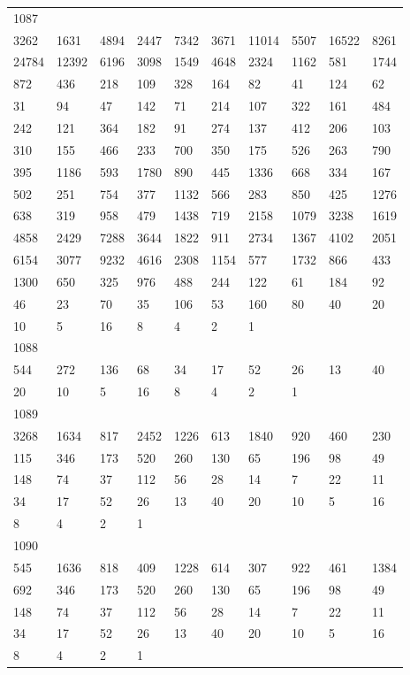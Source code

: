 \begin{longtable}{*{10}{l}}
1087&&&&&&&&&\\
3262& 1631& 4894& 2447& 7342& 3671& 11014& 5507& 16522& 8261\\
24784& 12392& 6196& 3098& 1549& 4648& 2324& 1162& 581& 1744\\
872& 436& 218& 109& 328& 164& 82& 41& 124& 62\\
31& 94& 47& 142& 71& 214& 107& 322& 161& 484\\
242& 121& 364& 182& 91& 274& 137& 412& 206& 103\\
310& 155& 466& 233& 700& 350& 175& 526& 263& 790\\
395& 1186& 593& 1780& 890& 445& 1336& 668& 334& 167\\
502& 251& 754& 377& 1132& 566& 283& 850& 425& 1276\\
638& 319& 958& 479& 1438& 719& 2158& 1079& 3238& 1619\\
4858& 2429& 7288& 3644& 1822& 911& 2734& 1367& 4102& 2051\\
6154& 3077& 9232& 4616& 2308& 1154& 577& 1732& 866& 433\\
1300& 650& 325& 976& 488& 244& 122& 61& 184& 92\\
46& 23& 70& 35& 106& 53& 160& 80& 40& 20\\
10& 5& 16& 8& 4& 2& 1& \\

1088&&&&&&&&&\\
544& 272& 136& 68& 34& 17& 52& 26& 13& 40\\
20& 10& 5& 16& 8& 4& 2& 1& \\

1089&&&&&&&&&\\
3268& 1634& 817& 2452& 1226& 613& 1840& 920& 460& 230\\
115& 346& 173& 520& 260& 130& 65& 196& 98& 49\\
148& 74& 37& 112& 56& 28& 14& 7& 22& 11\\
34& 17& 52& 26& 13& 40& 20& 10& 5& 16\\
8& 4& 2& 1& \\

1090&&&&&&&&&\\
545& 1636& 818& 409& 1228& 614& 307& 922& 461& 1384\\
692& 346& 173& 520& 260& 130& 65& 196& 98& 49\\
148& 74& 37& 112& 56& 28& 14& 7& 22& 11\\
34& 17& 52& 26& 13& 40& 20& 10& 5& 16\\
8& 4& 2& 1& \\


\end{longtable}
